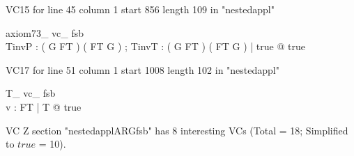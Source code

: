 \documentclass{article}
\begin{document}
VC15 for line 45 column 1 start 856 length 109 in "nestedappl"
\begin{theorem}{ axiom73\_ vc\_ fsb}\\
 \exists TinvP : ( G \fun FT ) \pfun ( FT \fun G ) ; TinvT : ( G \fun FT ) \fun ( FT \fun G ) | true @ true \\

\end{theorem}

VC17 for line 51 column 1 start 1008 length 102 in "nestedappl"
\begin{theorem}{ T\_ vc\_ fsb}\\
 \exists v : FT | T @ true \\

\end{theorem}



 VC Z section "nestedapplARGfsb" has $8$ interesting VCs (Total = 18; Simplified to $true$ = 10).



\end{document}
